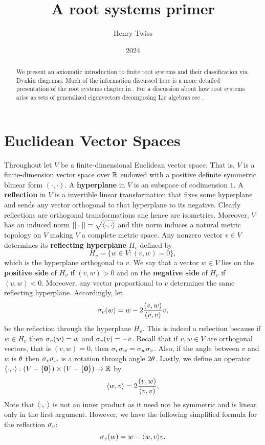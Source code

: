\documentclass[12pt,reqno,oneside]{amsart}
\title{A root systems primer}
\author{Henry Twiss}
\date{2024}
\begin{document}
\begin{abstract}
    We present an axiomatic introduction to finite root systems and their classification via Dynkin diagrmas. Much of the information discussed here is a more detailed presentation of the root systems chapter in \cite{Hu}. For a discussion about how root systems arise as sets of generalized eigenvectors decomposing Lie algebras see \cite{Hu}.
\end{abstract}

\maketitle

\section{Euclidean Vector Spaces}
    Throughout let $V$ be a finite-dimensional Euclidean vector space. That is, $V$ is a finite-dimension vector space over $\mathbb{R}$ endowed with a positive definite symmetric blinear form $(\cdot,\cdot)$. A \textbf{hyperplane} in $V$ is an subspace of codimension $1$. A \textbf{reflection} in $V$ is a invertible linear transformation that fixes some hyperplane and sends any vector orthogonal to that hyperplane to its negative. Clearly reflections are orthogonal transformations ane hence are isometries. Moreover, $V$ has an induced norm $||\cdot|| = \sqrt{\langle\cdot,\cdot\rangle}$ and this norm induces a natural metric topology on $V$ making $V$ a complete metric space. Any nonzero vector $v \in V$ determines its \textbf{reflecting hyperplane} $H_{v}$ defined by
    \[
        H_{v} = \{w \in V:(v,w) = 0\},
    \]
    which is the hyperplane orthogonal to $v$. We say that a vector $w \in V$ lies on the \textbf{positive side} of $H_{v}$ if $(v,w) > 0$ and on the \textbf{negative side} of $H_{v}$ if $(v,w) < 0$. Moreover, any vector proportional to $v$ determines the same reflecting hyperplane. Accordingly, let
    \[
        \sigma_{v}(w) = w-2\frac{(v,w)}{(v,v)}v, 
    \]
    be the reflection through the hyperplane $H_{v}$. This is indeed a reflection because if $w \in H_{v}$ then $\sigma_{v}(w) = w$ and $\sigma_{v}(v) = -v$. Recall that if $v,w \in V$ are orthogonal vectors, that is $(v,w) = 0$, then $\sigma_{v}\sigma_{w} = \sigma_{w}\sigma_{v}$. Also, if the angle between $v$ and $w$ is $\theta$ then $\sigma_{v}\sigma_{w}$ is a rotation through angle $2\theta$. Lastly, we define an operator $\langle\cdot,\cdot\rangle:(V-\{\mathbf{0}\}) \times (V-\{\mathbf{0}\}) \to \mathbb{R}$ by
    \[
        \langle w,v\rangle = 2\frac{(v,w)}{(v,v)},
    \]
    Note that $\langle\cdot,\cdot\rangle$ is not an inner product as it need not be symmetric and is linear only in the first argument. However, we have the following simplified formula for the reflection $\sigma_{v}$:
    \[
        \sigma_{v}(w) = w-\langle w,v\rangle v.
    \]
\end{document}
